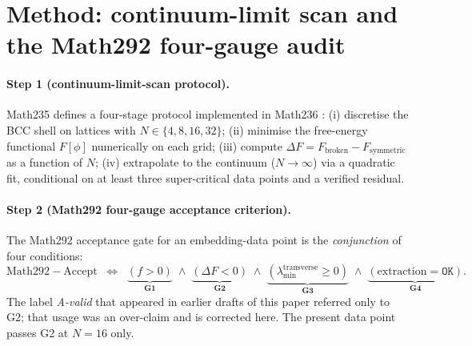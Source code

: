 \section{Method: continuum-limit scan and the Math292 four-gauge audit}
\label{sec:method}
\paragraph{Step 1 (continuum-limit-scan protocol).}
Math235 defines a four-stage protocol implemented in Math236
\cite{Math236}: (i) discretise the BCC shell on lattices with
$N\in\{4,8,16,32\}$; (ii) minimise the free-energy functional
$F[\phi]$ numerically on each grid; (iii) compute
$\Delta F = F_{\mathrm{broken}}-F_{\mathrm{symmetric}}$ as a function
of $N$; (iv) extrapolate to the continuum ($N\to\infty$) via a
quadratic fit, conditional on at least three super-critical data
points and a verified residual.

\paragraph{Step 2 (Math292 four-gauge acceptance criterion).}
The Math292 acceptance gate for an embedding-data point is the
\emph{conjunction} of four conditions:
\begin{equation}\label{eq:gauges}
  \mathrm{Math292\!-\!Accept} \;\;\Longleftrightarrow\;\;
  \underbrace{(f > 0)}_{\textbf{G1}} \;\wedge\;
  \underbrace{(\Delta F < 0)}_{\textbf{G2}} \;\wedge\;
  \underbrace{(\lambda_{\min}^{\mathrm{transverse}} \geq 0)}_{\textbf{G3}}
  \;\wedge\;
  \underbrace{(\text{extraction} = \texttt{OK})}_{\textbf{G4}}.
\end{equation}
The label \emph{A-valid} that appeared in earlier drafts of this paper
referred only to G2; that usage was an over-claim and is corrected
here. The present data point passes G2 at $N=16$ only.

